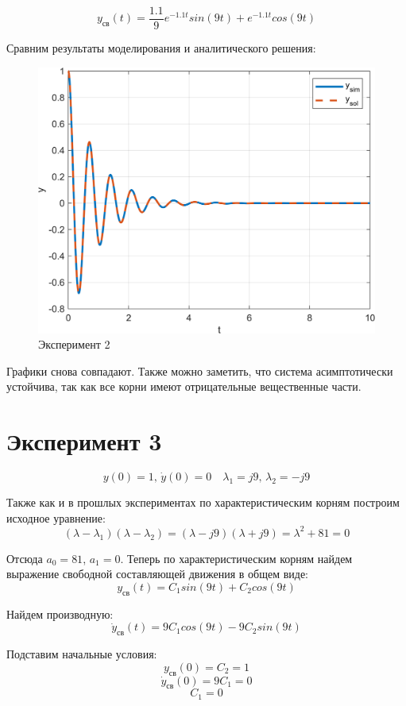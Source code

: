 \[y_{\text{св}}(t) = \frac{1.1}{9} e^{-1.1 t} sin(9t) + e^{-1.1 t} cos(9t)\]

Сравним результаты моделирования и аналитического решения:
\begin{figure}[H]
    \centering
    \includegraphics[width=1\textwidth, trim={0cm 0cm 0cm 0cm}]{../images/1_2.png}
    \caption{Эксперимент 2}
    \label{fig:exp2}
\end{figure}

Графики снова совпадают. Также можно заметить, что система асимптотически устойчива, так как все корни имеют отрицательные вещественные части.
\section{Эксперимент 3}
\[y(0) = 1,\, \dot y(0) = 0 \quad \lambda_1 = j9,\, \lambda_2 = -j9\]

Также как и в прошлых экспериментах по характеристическим корням построим исходное уравнение:
\[(\lambda - \lambda_1)(\lambda - \lambda_2) = (\lambda - j9)(\lambda + j9) = \lambda^2 + 81 = 0\]

Отсюда $a_0 = 81$, $a_1 = 0$. Теперь по характеристическим корням найдем выражение свободной составляющей движения в общем виде:
\[y_{\text{св}}(t) = C_1 sin(9t) + C_2 cos(9t)\]

Найдем производную:
\[\dot y_{\text{св}}(t) = 9C_1 cos(9t) - 9C_2 sin(9t)\]

Подставим начальные условия:
\[y_{\text{св}}(0) = C_2 = 1\]
\[\dot y_{\text{св}}(0) = 9C_1 = 0\]
\[C_1 = 0\]

